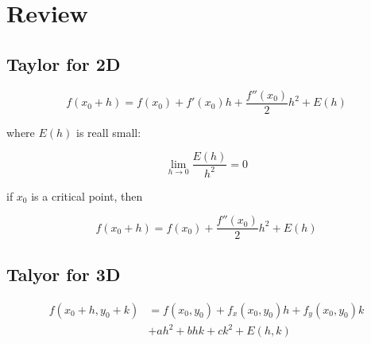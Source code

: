 \section{Review}

  \subsection{Taylor for 2D}

    \begin{equation}
      f\left( x_{0} + h \right)
        = f\left( x_{0} \right)
        + f'\left( x_{0} \right) h
        + \frac{f''\left( x_{0} \right)}{2} h^{2}
        + E\left( h \right)
    \end{equation}

    where $ E\left( h \right) $ is reall small:

    \begin{equation}
      \lim_{h \to 0} \frac{E\left( h \right)}{h^{2}} = 0
    \end{equation}

    if $ x_{0} $ is a critical point, then

    \begin{equation}
      f\left( x_{0} + h \right)
        = f\left( x_{0} \right)
        + \frac{f''\left( x_{0} \right)}{2} h^{2}
        + E\left( h \right)
    \end{equation}

  \subsection{Talyor for 3D}

    \begin{align*}
      f\left( x_{0} + h, y_{0} + k \right)
        &= f\left( x_{0}, y_{0} \right)
        + f_{x}\left( x_{0}, y_{0} \right) h
        + f_{y}\left( x_{0}, y_{0} \right) k \\
        &+ ah^{2} + bhk + ck^{2}
        + E\left( h, k \right)
    \end{align*}